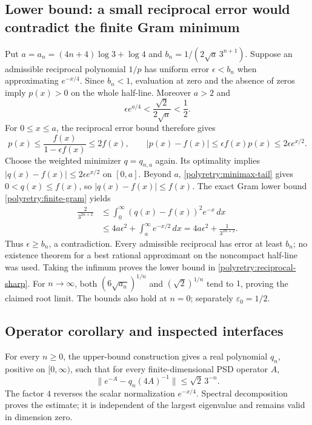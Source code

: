 \documentclass[11pt]{article}
\theoremstyle{remark}
\numberwithin{equation}{section}
\begin{document}
\subsection{Lower bound: a small reciprocal error would contradict the finite Gram minimum}
Put $a=a_n=(4n+4)\log3+\log4$ and
$b_n=1/(2\sqrt a\,3^{n+1})$.
Suppose an admissible reciprocal polynomial $1/p$ has uniform error
$\epsilon<b_n$ when approximating $e^{-x/4}$.
Since $b_n<1$, evaluation at zero and the absence of zeros imply
$p(x)>0$ on the whole half-line.  Moreover $a>2$ and
\[
 \epsilon e^{a/4}<\frac{\sqrt2}{2\sqrt a}<\frac12.
\]
For $0\le x\le a$, the reciprocal error bound therefore gives
\[
 p(x)\le\frac{f(x)}{1-\epsilon f(x)}\le2f(x),
 \qquad |p(x)-f(x)|\le\epsilon f(x)p(x)
                         \le2\epsilon e^{x/2}.
\]
Choose the weighted minimizer $q=q_{n,a}$ again.  Its optimality
implies $|q(x)-f(x)|\le2\epsilon e^{x/2}$ on $[0,a]$.
Beyond $a$, \eqref{polyretry:minimax-tail} gives
$0<q(x)\le f(x)$, so $|q(x)-f(x)|\le f(x)$.
The exact Gram lower bound \eqref{polyretry:finite-gram} yields
\begin{align*}
 \frac{2}{3^{2n+2}}
 &\le \int_0^\infty(q(x)-f(x))^2e^{-x}\,dx\\
 &\le 4a\epsilon^2+\int_a^\infty e^{-x/2}\,dx
  =4a\epsilon^2+\frac{1}{3^{2n+2}}.
\end{align*}
Thus $\epsilon\ge b_n$, a contradiction.  Every admissible reciprocal
has error at least $b_n$; no existence theorem for a best rational
approximant on the noncompact half-line was used.  Taking the infimum
proves the lower bound in \eqref{polyretry:reciprocal-sharp}.
For $n\to\infty$, both $(6\sqrt{a_n})^{1/n}$ and
$(\sqrt2)^{1/n}$ tend to $1$, proving the claimed root limit.
The bounds also hold at $n=0$; separately $\varepsilon_0=1/2$.

\subsection{Operator corollary and inspected interfaces}
For every $n\ge0$, the upper-bound construction gives a real polynomial
$q_n$, positive on $[0,\infty)$, such that for every finite-dimensional
PSD operator $A$,
\[
 \|e^{-A}-q_n(4A)^{-1}\|\le\sqrt2\,3^{-n}.
\]
The factor $4$ reverses the scalar normalization $e^{-x/4}$.
Spectral decomposition proves the estimate; it is independent of the
largest eigenvalue and remains valid in dimension zero.
\end{document}
